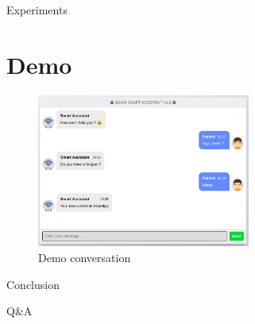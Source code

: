 \documentclass[10pt]{beamer}
\begin{document}

\begin{frame}{Experiments}
    \section{Demo}
    \begin{figure}[H]
    \centering
    \includegraphics[width=7cm]{image/demo_ui.png}
    \caption{Demo conversation}
    \label{fig:demo}
    \end{figure}
\end{frame}

\begin{frame}{Conclusion}
    \begin{center}
        Q\&A
    \end{center}
\end{frame}
\end{document}
